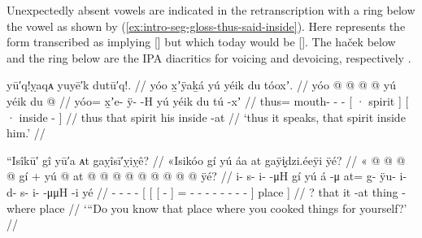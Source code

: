 Unexpectedly absent vowels are indicated in the retranscription with a ring below the vowel as shown by (\ref{ex:intro-seg-gloss-thus-said-inside}).
Here  represents the form \citeauthor{swanton:1909} transcribed as  implying  [] but which today would be  [].
The haček below  and the ring below  are the IPA diacritics for voicing and devoicing, respectively \parencites{international-phonetic-association:1999}{international-phonetic-association:2018}.

\ex\label{ex:intro-seg-gloss-thus-said-inside}%
%
\begingl
	\glpreamble	yū′q!ỵaqᴀ yuyē′k dutū′q!. //
	\glpreamble	yóo x̱ʼÿaḵá yú yéik du tóoxʼ. //
	\gla	yóo @  @ {} @ {} @ {}
		{} yú yéik {}
		{} du  @ {} {} //
	\glb	yóo= x̱ʼe- ÿ-  -H
		{} yú yéik {}
		{} du tú -xʼ {} //
	\glc	thus= mouth- -  -
		{}[ · spirit {}]
		{}[ · inside - {}] //
	\gld	thus  {} {} {}
		{} that spirit {}
		{} his inside -at {} //
	\glft	‘thus it speaks, that spirit inside him.’
		//
\endgl
\xe




\ex\label{ex:intro-seg-gloss-place-where-you-cooked}%
%
\begingl
	\glpreamble	“Isîkū′ gî yū′a ᴀt gaỵîsī′ỵiỵê? //
	\glpreamble	«\!Isikóo gí yú áa at gaÿi̬dzi.éeÿi ÿé? //
	\gla	«\! @ {} @ {} @ {} @ {} gí +
		{} yú {} {}  @ {} {} 
			at @  @ {} @ {} @ {} @ {} @ {} @ {} @ {} @ {} {} ÿé? {} //
	\glb	\pqp{}i- s- i-  -μH gí
		{} yú {} {} á -μ {} 
			at= g- ÿu- i- d- s- i-  -μμH -i {} yé {} //
	\glc	\pqp{}- - -  - 
		{}[  {}[ {}[  - {}]
			= - - - - - - 
				 - - {}]
		place {}] //
	\gld	\pqp{} {} {} {} {} ?
		{} that {} {} it -at {}
			thing  {} {} {} {} {} {} {} -where {} place {} //
	\glft	‘“Do you know that place where you cooked things for yourself?’
		//
\endgl
\xe
